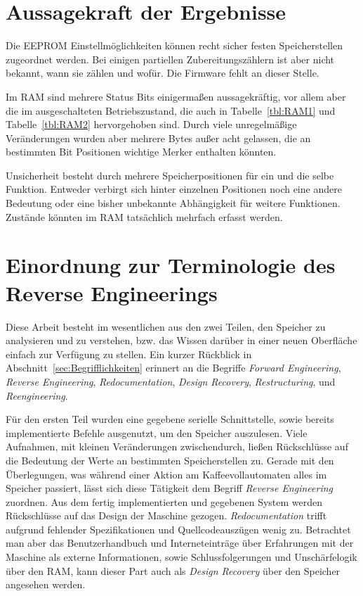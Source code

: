 \section{Aussagekraft der Ergebnisse}\label{sec:AussagekraftDerErgebnisse}
Die \ac{EEPROM} Einstellmöglichkeiten können recht sicher festen Speicherstellen zugeordnet werden.
Bei einigen partiellen Zubereitungszählern ist aber nicht bekannt, wann sie zählen und wofür.
Die Firmware fehlt an dieser Stelle.

Im \ac{RAM} sind mehrere Status Bits einigermaßen aussagekräftig, vor allem aber die im ausgeschalteten Betriebszustand, die auch in Tabelle~\ref{tbl:RAM1} und Tabelle~\ref{tbl:RAM2} hervorgehoben sind.
Durch viele unregelmäßige Veränderungen wurden aber mehrere Bytes außer acht gelassen, die an bestimmten Bit Positionen wichtige Merker enthalten könnten.

Unsicherheit besteht durch mehrere Speicherpositionen für ein und die selbe Funktion.
Entweder verbirgt sich hinter einzelnen Positionen noch eine andere Bedeutung oder eine bisher unbekannte Abhängigkeit für weitere Funktionen.
Zustände könnten im \ac{RAM} tatsächlich mehrfach erfasst werden.

\section{Einordnung zur Terminologie des Reverse Engineerings}\label{sec:DiskussionBegriffReverseEngineering}
Diese Arbeit besteht im wesentlichen aus den zwei Teilen, den Speicher zu analysieren und zu verstehen, bzw. das Wissen darüber in einer neuen Oberfläche einfach zur Verfügung zu stellen.
Ein kurzer Rückblick in Abschnitt~\ref{sec:Begrifflichkeiten} erinnert an die Begriffe \textit{Forward Engineering}, \textit{Reverse Engineering}, \textit{Redocumentation}, \textit{Design Recovery}, \textit{Restructuring}, und \textit{Reengineering}.

Für den ersten Teil wurden eine gegebene serielle Schnittstelle, sowie bereits implementierte Befehle ausgenutzt, um den Speicher auszulesen.
Viele Aufnahmen, mit kleinen Veränderungen zwischendurch, ließen Rückschlüsse auf die Bedeutung der Werte an bestimmten Speicherstellen zu.
Gerade mit den Überlegungen, was während einer Aktion am Kaffeevollautomaten alles im Speicher passiert, lässt sich diese Tätigkeit dem Begriff \textit{Reverse Engineering} zuordnen.
Aus dem fertig implementierten und gegebenen System werden Rückschlüsse auf das Design der Maschine gezogen.
\textit{Redocumentation} trifft aufgrund fehlender Spezifikationen und Quellcodeauszügen wenig zu.
Betrachtet man aber das Benutzerhandbuch und Interneteinträge über Erfahrungen mit der Maschine als externe Informationen, sowie Schlussfolgerungen und Unschärfelogik über den \ac{RAM}, kann dieser Part auch als \textit{Design Recovery} über den Speicher angesehen werden.

